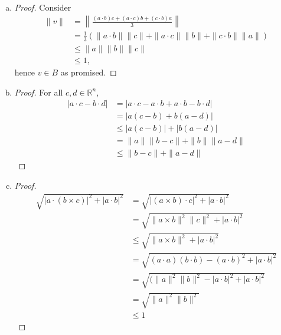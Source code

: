 \begin{Exercise}
\begin{enumerate}[a)]
\item 
\begin{proof}
Consider 
\begin{align*}
\|v\| 
&= \left\| \frac{(a\cdot b)c+(a\cdot c)b+(c\cdot b)a}{3} \right\| \\
&= \frac{1}{3} \left( \|a\cdot b\| \|c\| + \|a\cdot c\| \|b\|+\|c\cdot b\| \|a\|\right) \\
&\leq \|a\|\|b\| \|c\| \\
&\leq 1,
\end{align*}
hence $v\in B$ as promised.
\end{proof}

\item
\begin{proof}
For all $c, d\in \mathbb{R}^n$,
\begin{align*}
|a\cdot c - b\cdot d|
&= |a\cdot c - a\cdot b + a\cdot b - b\cdot d| \\
&= | a(c-b) + b(a-d) | \\
&\leq | a(c-b) | + | b(a-d) | \\
&= \|a\|\|b-c\| + \|b\|\|a-d\| \\
&\leq \|b-c\| + \|a-d\|
\end{align*}
\end{proof}

\item
\begin{proof}
\begin{align*}
\sqrt{|a\cdot (b \times c) |^2 + |a\cdot b|^2}
&= \sqrt{|(a \times b) \cdot c|^2 + |a\cdot b|^2} \\
&= \sqrt{\|a\times b\|^2 \|c\|^2 + |a\cdot b|^2} \\
&\leq \sqrt{\|a\times b\|^2 + |a\cdot b|^2} \\
&= \sqrt{(a\cdot a)(b\cdot b) - (a\cdot b)^2 + |a\cdot b|^2} \\
&= \sqrt{(\|a\|^2 \|b\|^2 - |a\cdot b|^2 + |a\cdot b|^2} \\
&= \sqrt{\|a\|^2 \|b\|^2} \\
&\leq 1
\end{align*}
\end{proof}
\end{enumerate}
\end{Exercise}